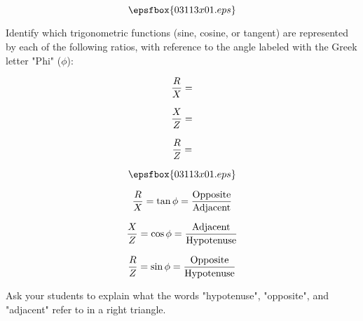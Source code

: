 

$$\epsfbox{03113x01.eps}$$

Identify which trigonometric functions (sine, cosine, or tangent) are represented by each of the following ratios, with reference to the angle labeled with the Greek letter "Phi" ($\phi$):

$${R \over X} = $$

$${X \over Z} = $$

$${R \over Z} = $$







$$\epsfbox{03113x01.eps}$$

$${R \over X} = \tan \phi = {\hbox{Opposite} \over \hbox{Adjacent}}$$

$${X \over Z} = \cos \phi = {\hbox{Adjacent} \over \hbox{Hypotenuse}}$$

$${R \over Z} = \sin \phi = {\hbox{Opposite} \over \hbox{Hypotenuse}}$$







Ask your students to explain what the words "hypotenuse", "opposite", and "adjacent" refer to in a right triangle.




